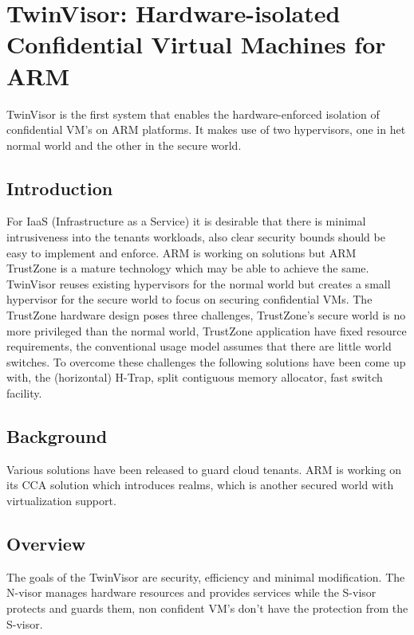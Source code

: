 \documentclass{article}
\begin{document}
\section{TwinVisor: Hardware-isolated Confidential Virtual Machines for ARM}

TwinVisor is the first system that enables the hardware-enforced isolation of confidential VM's on ARM platforms. It makes use of two hypervisors, one in het normal world and the other in the secure world. 

\subsection{Introduction}

For IaaS (Infrastructure as a Service) it is desirable that there is minimal intrusiveness into the tenants workloads, also clear security bounds should be easy to implement and enforce. ARM is working on solutions but ARM TrustZone is a mature technology which may be able to achieve the same. TwinVisor reuses existing hypervisors for the normal world but creates a small hypervisor for the secure world to focus on securing confidential VMs. The TrustZone hardware design poses three challenges, TrustZone's secure world is no more privileged than the normal world, TrustZone application have fixed resource requirements, the conventional usage model assumes that there are little world switches. To overcome these challenges the following solutions have been come up with, the (horizontal) H-Trap, split contiguous memory allocator, fast switch facility. 

\subsection{Background}

Various solutions have been released to guard cloud tenants. ARM is working on its CCA solution which introduces realms, which is another secured world with virtualization support.

\subsection{Overview}

The goals of the TwinVisor are security, efficiency and minimal modification. The N-visor manages hardware resources and provides services while the S-visor protects and guards them, non confident VM's don't have the protection from the S-visor. 
\medskip
\end{document}
